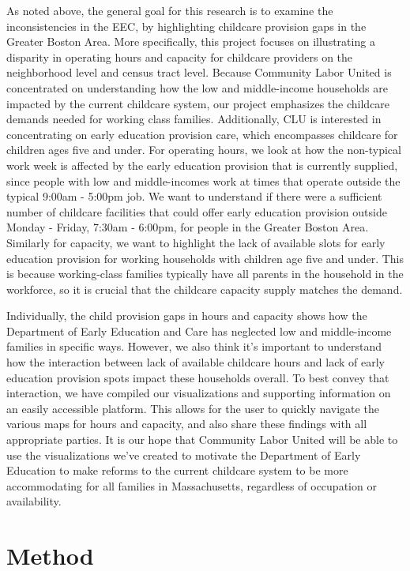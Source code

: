 \documentclass[10pt,letterpaper]{article}
\begin{document}
As noted above, the general goal for this research is to examine the
inconsistencies in the EEC, by highlighting childcare provision gaps in
the Greater Boston Area. More specifically, this project focuses on
illustrating a disparity in operating hours and capacity for childcare
providers on the neighborhood level and census tract level. Because
Community Labor United is concentrated on understanding how the low and
middle-income households are impacted by the current childcare system,
our project emphasizes the childcare demands needed for working class
families. Additionally, CLU is interested in concentrating on early
education provision care, which encompasses childcare for children ages
five and under. For operating hours, we look at how the non-typical work
week is affected by the early education provision that is currently
supplied, since people with low and middle-incomes work at times that
operate outside the typical 9:00am - 5:00pm job. We want to understand
if there were a sufficient number of childcare facilities that could
offer early education provision outside Monday - Friday, 7:30am -
6:00pm, for people in the Greater Boston Area. Similarly for capacity,
we want to highlight the lack of available slots for early education
provision for working households with children age five and under. This
is because working-class families typically have all parents in the
household in the workforce, so it is crucial that the childcare capacity
supply matches the demand.

Individually, the child provision gaps in hours and capacity shows how
the Department of Early Education and Care has neglected low and
middle-income families in specific ways. However, we also think it's
important to understand how the interaction between lack of available
childcare hours and lack of early education provision spots impact these
households overall. To best convey that interaction, we have compiled
our visualizations and supporting information on an easily accessible
platform. This allows for the user to quickly navigate the various maps
for hours and capacity, and also share these findings with all
appropriate parties. It is our hope that Community Labor United will be
able to use the visualizations we've created to motivate the Department
of Early Education to make reforms to the current childcare system to be
more accommodating for all families in Massachusetts, regardless of
occupation or availability.

\section{Method}\label{method}
\end{document}
